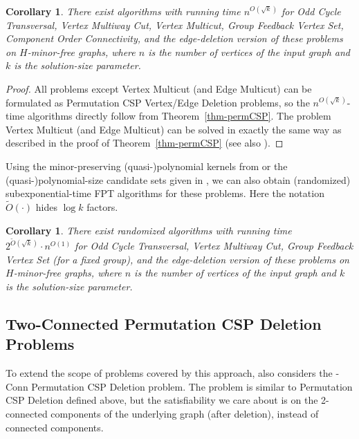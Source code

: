 \documentclass[a4paper,11pt]{article}
\numberwithin{lemma}{section}
\newtheorem{corollary}[lemma]{Corollary}
\begin{document}
\begin{corollary}
 There exist algorithms with running time $n^{O(\sqrt{k})}$ for {\sc Odd Cycle Transversal}, {\sc Vertex Multiway Cut}, {\sc Vertex Multicut}, {\sc Group Feedback Vertex Set}, {\sc Component Order Connectivity}, and the edge-deletion version of these problems on $H$-minor-free graphs, where $n$ is the number of vertices of the input graph and $k$ is the solution-size parameter.
\end{corollary}

\begin{proof}
 All problems except {\sc Vertex Multicut} (and {\sc Edge Multicut}) can be formulated as {\sc Permutation CSP Vertex/Edge Deletion} problems, so the $n^{O(\sqrt{k})}$-time algorithms directly follow from Theorem~\ref{thm-permCSP}.
 The problem {\sc Vertex Multicut} (and {\sc Edge Multicut}) can be solved in exactly the same way as described in the proof of Theorem~\ref{thm-permCSP} (see also \cite[Section~5.3]{BandyapadhyayLLSJ22}).
\end{proof}

Using the minor-preserving (quasi-)polynomial kernels from \cite{MarxMNT22} or the (quasi-)polynomial-size candidate sets given in \cite{BandyapadhyayLLSJ22}, we can also obtain (randomized) subexponential-time FPT algorithms for these problems.
Here the notation $\widetilde{O}(\cdot)$ hides $\log k$ factors.

\begin{corollary}
 There exist randomized algorithms with running time $2^{\widetilde{O}(\sqrt{k})} \cdot n^{O(1)}$ for {\sc Odd Cycle Transversal}, {\sc Vertex Multiway Cut}, {\sc Group Feedback Vertex Set} (for a fixed group), and the edge-deletion version of these problems on $H$-minor-free graphs, where $n$ is the number of vertices of the input graph and $k$ is the solution-size parameter.
\end{corollary}

\subsection{Two-Connected Permutation CSP Deletion Problems}

To extend the scope of problems covered by this approach, \cite{MarxMNT22} also considers the {-Conn Permutation CSP Deletion} problem.
The problem is similar to {\sc Permutation CSP Deletion} defined above, but the satisfiability we care about is on the 2-connected components of the underlying graph (after deletion), instead of connected components.
\end{document}
